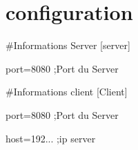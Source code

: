 \chapter{configuration}
\hypertarget{md_configuration}{}\label{md_configuration}
\#\+Informations Server \mbox{[}server\mbox{]}

port=8080 ;Port du Server

\#\+Informations client \mbox{[}Client\mbox{]}

port=8080 ;Port du Server

host=192... ;ip server 